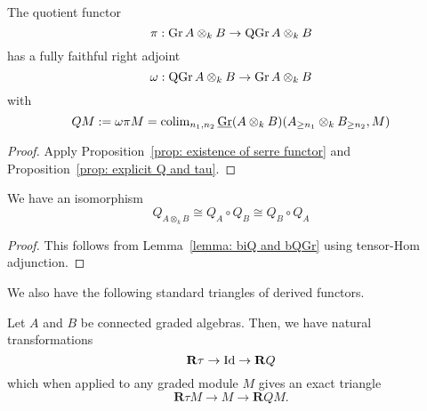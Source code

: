 \begin{lemma} \label{lemma: biQ and bQGr}
  The quotient functor 
  \begin{displaymath}
    \pi : \operatorname{Gr}A \otimes_k B \to \operatorname{QGr}A \otimes_k B
  \end{displaymath}
  has a fully faithful right adjoint 
  \begin{displaymath}
    \omega : \operatorname{QGr}A \otimes_k B \to \operatorname{Gr}A \otimes_k B
  \end{displaymath}
  with 
  \begin{displaymath}
    QM := \omega \pi M = \operatorname{colim}_{n_1,n_2} \underline{\operatorname{Gr}}(A \otimes_k B)( A_{\geq n_1} \otimes_k B_{\geq n_2} , M)
  \end{displaymath}
\end{lemma}

\begin{proof}
  Apply Proposition~\ref{prop: existence of serre functor} and Proposition~\ref{prop: explicit Q and tau}.
\end{proof}

\begin{corollary}\label{corollary: relation on Qs}
  We have an isomorphism 
  \begin{displaymath}
    Q_{A \otimes_k B} \cong Q_A \circ Q_B \cong Q_B \circ Q_A
  \end{displaymath}
\end{corollary}

\begin{proof}
  This follows from Lemma~\ref{lemma: biQ and bQGr} using tensor-Hom adjunction. 
\end{proof}

We also have the following standard triangles of derived functors. 

\begin{lemma} \label{lemma: exact triangles}
  Let \(A\) and \(B\) be connected graded algebras. Then, we have natural transformations 
  \begin{displaymath}
    \mathbf{R} \tau \to \operatorname{Id} \to \mathbf{R} Q 
  \end{displaymath}
  which when applied to any graded module \(M\) gives an exact triangle 
  \begin{displaymath}
    \mathbf{R} \tau M \to M \to \mathbf{R} Q M.
  \end{displaymath}
\end{lemma}

